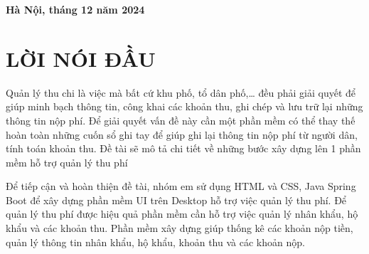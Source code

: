 \documentclass{article}
\begin{document}
\begin{titlepage}
\begin{Border}
\begin{center}
        \vspace{1.5cm}
        \fontsize{14pt}{0pt}\selectfont \textbf{Hà Nội, tháng 12 năm 2024}
    \end{center}
\end{Border}
\end{titlepage}
\newpage

\renewcommand{\contentsname}{\textbf{MỤC LỤC}} %
\renewcommand{\cfttoctitlefont}{\hfill\fontsize{16pt}{0pt}\selectfont\bfseries} %
\renewcommand{\cftaftertoctitle}{\hfill} %
\tableofcontents %
\cleardoublepage

\section*{LỜI NÓI ĐẦU}
Quản lý thu chi là việc mà bất cứ khu phố, tổ dân phố,… đều phải giải quyết để
giúp minh bạch thông tin, công khai các khoản thu, ghi chép và lưu trữ lại những
thông tin nộp phí. Để giải quyết vấn đề này cần một phần mềm có thể thay thế hoàn
toàn những cuốn sổ ghi tay để giúp ghi lại thông tin nộp phí từ người dân, tính toán
khoản thu. Đề tài sẽ mô tả chi tiết về những bước xây dựng lên 1 phần mềm hỗ trợ
quản lý thu phí 

Để tiếp cận và hoàn thiện đề tài, nhóm em sử dụng HTML và CSS, Java Spring 
Boot để xây dựng phần mềm UI trên Desktop hỗ trợ việc quản lý thu phí. Để quản lý thu phí được hiệu quả phần mềm cần hỗ trợ việc quản lý nhân khẩu, hộ khẩu và các khoản thu. Phần
mềm xây dựng giúp thống kê các khoản nộp tiền, quản lý thông tin nhân khẩu, hộ khẩu, khoản thu và các khoản nộp.
\newpage

\end{document}

